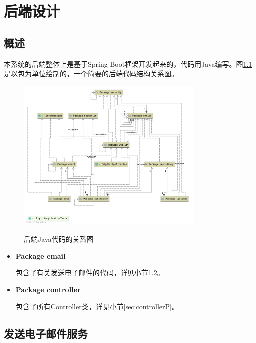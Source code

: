 
\chapter{后端设计}

\section{概述}

本系统的后端整体上是基于Spring Boot框架开发起来的，代码用Java编写。图\ref{fig:package}是以包为单位绘制的，一个简要的后端代码结构关系图。

\begin{figure}[!htb]
	\centering
	\includegraphics[width=0.8\textwidth]
	{figures/package.png}\\
	\caption{后端Java代码的关系图}
	\label{fig:package}
\end{figure}

\begin{itemize}

	\item \textbf{Package email}
	
	包含了有关发送电子邮件的代码，详见小节\ref{sec:emailP}。
	
	\item \textbf{Package controller}
	
	包含了所有Controller类，详见小节\ref{sec:controllerP}。

\end{itemize}

\section{发送电子邮件服务}\label{sec:emailP}

